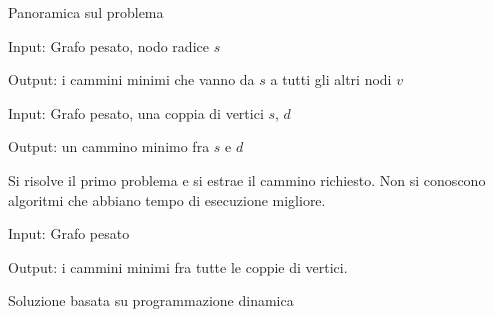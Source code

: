 \begin{frame}[shrink=5]{Panoramica sul problema}
\BI
\item \alert{Input}: Grafo pesato, nodo radice $s$ 
\item \alert{Output}: i cammini minimi che vanno da $s$ a tutti gli altri nodi $v$
\EI

\BI
\item \alert{Input}: Grafo pesato, una coppia di vertici $s$, $d$
\item \alert{Output}: un cammino minimo fra $s$ e $d$
\item Si risolve il primo problema e si estrae il cammino richiesto. 
Non si conoscono algoritmi che abbiano tempo di esecuzione migliore.
\EI

\BI
\item \alert{Input}: Grafo pesato
\item \alert{Output}: i cammini minimi fra tutte le coppie di vertici. 
\item Soluzione basata su programmazione dinamica		
\EI
\end{frame}

